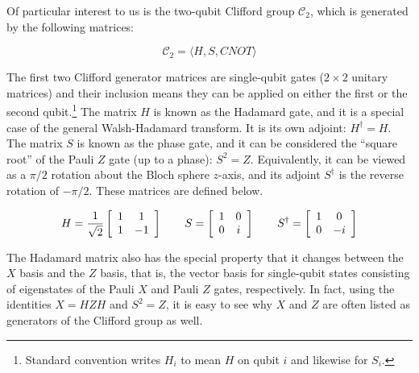 Of particular interest to us is the two-qubit Clifford group $\mathcal{C}_2$,
which is generated by the following matrices:

\begin{equation}
\mathcal{C}_2 = \langle H, S, CNOT \rangle
\end{equation}

The first two Clifford generator matrices are single-qubit gates ($2 \times 2$ unitary matrices) and
their inclusion means they can be applied on either the first or the second
qubit.\footnote{Standard convention writes $H_i$ to mean $H$ on qubit $i$ and likewise for $S_i$.}
The matrix $H$ is known as the Hadamard gate, and it is a special case of the
general Walsh-Hadamard transform. It is its own adjoint: $H^{\dagger} = H$.
The matrix $S$ is known as the phase gate, and it can be considered the
``square root'' of the Pauli $Z$ gate (up to a phase): $S^2 = Z$.
Equivalently, it can be viewed as a $\pi/2$ rotation about the Bloch sphere
$z$-axis, and its adjoint $S^{\dagger}$ is the reverse rotation of $-\pi /2$.
These matrices are defined below.

\begin{equation}
H = \frac{1}{\sqrt{2}}
 \left[
  \begin{array}{cc}
    1 & 1 \\
    1 & -1 \\
  \end{array} \right]
\qquad
S = 
 \left[
  \begin{array}{cc}
    1 & 0 \\
    0 & i \\
  \end{array} \right]
\qquad
S^{\dagger} = 
 \left[
  \begin{array}{cc}
    1 & 0 \\
    0 & -i \\
  \end{array} \right]
\end{equation}

The Hadamard matrix also has the special property that it changes between the
$X$ basis and the $Z$ basis, that is, the vector basis for single-qubit
states consisting of eigenstates of the Pauli $X$ and Pauli $Z$ gates,
respectively. In fact, using the identities $X = HZH$ and $S^2 = Z$, it
is easy to see why $X$ and $Z$ are often listed as generators of the
Clifford group as well.

